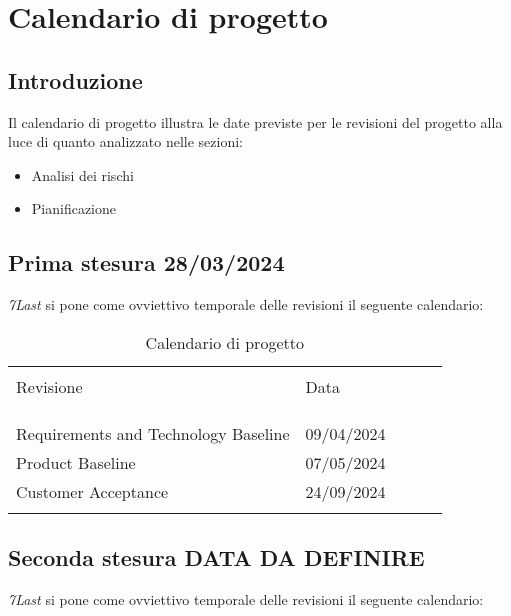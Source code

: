 \section{Calendario di progetto}
\subsection{Introduzione}
Il calendario di progetto illustra le date previste per le revisioni del progetto alla luce di quanto analizzato nelle sezioni:
\begin{itemize}
    \item Analisi dei rischi  
    \item Pianificazione
\end{itemize}

\subsection{Prima stesura 28/03/2024}
\textit{7Last} si pone come ovviettivo temporale delle revisioni il seguente calendario:
\begin{table}[!h]

    \begin{center}
        \begin{tabular}{ l l l l p{9cm} }
            \hline                                                                                                          \\[-2ex]
            Revisione & Data\\
            \\[-2ex] \hline \\[-1.5ex]                                                                                      \\
            Requirements and Technology Baseline & 09/04/2024 \\
            Product Baseline & 07/05/2024 \\
            Customer Acceptance & 24/09/2024 \\
            \\[-1.5ex] \hline
        \end{tabular}
    \end{center}
    \caption{Calendario di progetto}
    \label{tab:1}
\end{table}
\newpage
\subsection{Seconda stesura DATA DA DEFINIRE}
\textit{7Last} si pone come ovviettivo temporale delle revisioni il seguente calendario:

